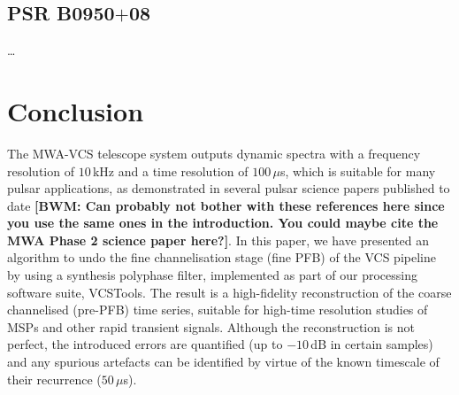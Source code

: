 \documentclass{pasa}%
\newcommand{\vcstools}{VCSTools}
\newcommand{\psrslowB}{B0950$+$08}
\begin{document}
\subsection{PSR \psrslowB{}}

\dots

\section{Conclusion}

The MWA-VCS telescope system outputs dynamic spectra with a frequency resolution of $10\,$kHz and a time resolution of $100\,\mu$s, which is suitable for many pulsar applications, as demonstrated in several pulsar science papers published to date \citep[e.g.][]{Oronsaye2015,McSweeney2017,Bhat2018}\textbf{[BWM: Can probably not bother with these references here since you use the same ones in the introduction. You could maybe cite the MWA Phase 2 science paper here?]}.
In this paper, we have presented an algorithm to undo the fine channelisation stage (fine PFB) of the VCS pipeline by using a synthesis polyphase filter, implemented as part of our processing software suite, \vcstools{}.
The result is a high-fidelity reconstruction of the coarse channelised (pre-PFB) time series, suitable for high-time resolution studies of MSPs and other rapid transient signals.
Although the reconstruction is not perfect, the introduced errors are quantified (up to $-10\,$dB in certain samples) and any spurious artefacts can be identified by virtue of the known timescale of their recurrence ($50\,\mu$s).
\end{document}
